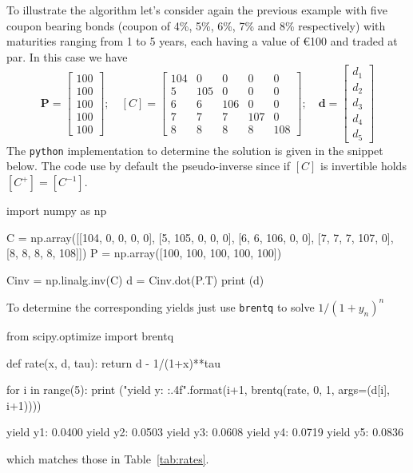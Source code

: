 To illustrate the algorithm let's consider again the previous example with five coupon bearing bonds (coupon of 4\%, 5\%, 6\%, 7\% and 8\% respectively) with maturities ranging from 1 to 5 years, each having a value of \euro{100} and traded at par. In this case we have
\begin{equation*}
\boldsymbol{P} = 
\begin{bmatrix}
100 \\
100 \\
100 \\
100 \\
100 
\end{bmatrix}; \quad
[C] = 
\begin{bmatrix}
104 & 0 & 0 & 0 & 0 \\
5 & 105 & 0 & 0 & 0 \\
6 & 6 & 106 & 0 & 0 \\
7 & 7 & 7 & 107 & 0 \\
8 & 8 & 8 & 8 & 108
\end{bmatrix}; \quad \boldsymbol{d} =
\begin{bmatrix}
d_1 \\
d_2 \\
d_3 \\
d_4 \\
d_5 
\end{bmatrix}
\end{equation*}
The \texttt{python} implementation to determine the solution is given in the snippet below. The code use by default the pseudo-inverse since if $[C]$ is invertible holds $[C^+] = [C^{-1}]$. 
\begin{ipython}
import numpy as np

C = np.array([[104, 0, 0, 0, 0],
              [5, 105, 0, 0, 0],
              [6, 6, 106, 0, 0],
              [7, 7, 7, 107, 0],
              [8, 8, 8, 8, 108]])
P = np.array([100, 100, 100, 100, 100])

Cinv = np.linalg.inv(C)
d = Cinv.dot(P.T)
print (d)
\end{ipython}
\begin{ioutput}
[0.96153846 0.90659341 0.83765291 0.75756548 0.66938146]	
\end{ioutput}
To determine the corresponding yields just use \texttt{brentq} to solve $1/(1+y_n)^{n}$
\begin{ipython}
from scipy.optimize import brentq

def rate(x, d, tau):
    return d - 1/(1+x)**tau

for i in range(5):
    print ("yield y{}: {:.4f}".format(i+1, brentq(rate, 0, 1, args=(d[i], i+1))))
\end{ipython}
\begin{ioutput}
yield y1: 0.0400
yield y2: 0.0503
yield y3: 0.0608
yield y4: 0.0719
yield y5: 0.0836
\end{ioutput}
which matches those in Table~\ref{tab:rates}.

